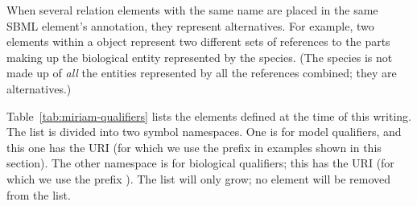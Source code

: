 When several relation elements with the same name are placed in
the same SBML element's annotation, they represent alternatives.
For example, two  elements within a \Species
object represent two different sets of references to the parts
making up the biological entity represented by the species.  (The
species is not made up of \emph{all} the entities represented by
all the references combined; they are alternatives.)

Table~\vref{tab:miriam-qualifiers} lists the elements defined at
the time of this writing.  The list is divided into two symbol
namespaces.  One is for model qualifiers, and this one has the URI
 (for which we use the
prefix  in examples shown in this section).  The
other namespace is for biological qualifiers; this has the URI
 (for which we use
the prefix ).  The list will only grow; \ie no
element will be removed from the list.

